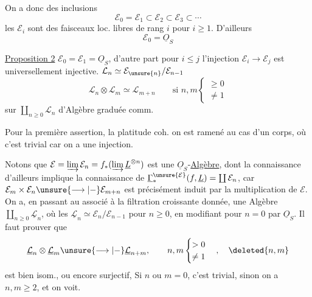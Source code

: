 
 On a donc des  inclusions
\[
\mathcal E_0=\mathcal E_1\subset\mathcal E_2\subset\mathcal E_3\subset\cdots
\]
les $\mathcal E_i$ sont des faisceaux loc. libres de rang $i$ pour $i\geq1$. D'ailleurs
\[
\mathcal E_0=\underline O_S
\]

\uline{Proposition 2} $\mathcal E_0=\mathcal E_1=\underline O_S$, d'autre part pour $i\leq j$ l'injection $\mathcal E_i\longrightarrow\mathcal E_j$ est  universellement injective.
  $\mathcal L_n\simeq\mathcal E_{\unsure{n}}/\mathcal E_{n-1}$  
\[
\mathcal L_n\otimes\mathcal L_m\simeq\mathcal L_{m+n}\qquad\text{si }n,m\begin{cases}\geq0\\\neq1\end{cases}
\]
   sur $\coprod_{n\geq0}\mathcal L_n$  d'Algèbre graduée comm.

Pour la première assertion,  la platitude coh. on est ramené au cas d'un corps, où c'est trivial car on a une injection.

Notons que $\mathcal E=\varinjlim\mathcal E_n=f_*(\varinjlim\underline L^{\otimes n})$ est une $\underline O_S$-\uline{Algèbre}, dont la connaissance d'ailleurs implique la connaissance de $\underline\Gamma_*^{\unsure{\mathcal E}}(f,\underline L)=\coprod\mathcal E_n$, car $\mathcal E_m\times\mathcal E_n\unsure{\longrightarrow|-}\mathcal E_{m+n}$ est précisément induit par la multiplication de $\mathcal E$. On a, en passant au  associé à la filtration croissante donnée, une Algèbre $\coprod_{n\geq0}\underline{\mathcal L}_n$, où les $\underline{\mathcal L}_n\simeq\mathcal E_n/\mathcal E_{n-1}$ pour $n\geq0$, en modifiant pour $n=0$ par $\underline O_S$. Il faut prouver que
\[
\underline{\mathcal L}_n\otimes\underline{\mathcal L}_m\unsure{\longrightarrow|-}\underline{\mathcal L}_{n+m},\qquad n,m\begin{cases}>0\\\neq1\end{cases},\quad\deleted{n,m}
\]
est bien isom., ou encore surjectif,  Si $n$ ou $m=0$,  c'est trivial, sinon on a $n,m\geq2$, et on voit.

